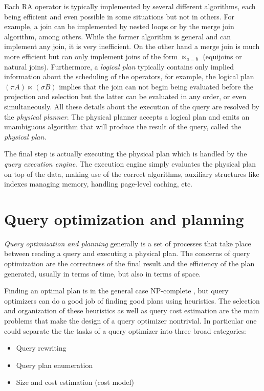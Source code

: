 Each RA operator is typically implemented by several different
algorithms, each being efficient and even possible in some situations
but not in others. For example, a join can be implemented by nested
loops or by the merge join algorithm, among others.  While the former algorithm is
general and can implement any join, it is very inefficient. On the
other hand a merge join is much more efficient but can only implement
joins of the form \(\Join_{a=b}\) (equijoins or natural
joins). Furthermore, a \emph{logical plan} typically contains only
implied information about the scheduling of the operators, for
example, the logical plan \((\pi A) \Join (\sigma B)\) implies that
the join can not begin being evaluated before the projection and
selection but the latter can be evaluated in any order, or even
simultaneously. All these details about the execution
of the query are resolved by the \emph{physical planner}. The physical
planner accepts a logical plan and emits an unambiguous algorithm that
will produce the result of the query, called the \emph{physical plan}.

The final step is actually executing the physical plan which is
handled by the \emph{query execution engine}. The execution engine
simply evaluates the physical plan on top of the data, making use of
the correct algorithms, auxiliary structures like indexes managing
memory, handling page-level caching, etc.

\section{Query optimization and planning}

\emph{Query optimization and planning} generally is a set of processes that
take place between reading a query and executing a physical plan. The
concerns of query optimization are the correctness of the final result and
the efficiency of the plan generated, usually in terms of time, but
also in terms of space.

Finding an optimal plan is in the general case NP-complete
\cite{ullmanInformationIntegrationUsing1997}, but query optimizers can
do a good job of finding good plans using heuristics. The selection
and organization of these heuristics as well as query cost estimation
are the main problems that make the design of a query optimizer nontrivial. In
particular one could separate the the tasks of a query optimizer
into three broad categories:

\begin{itemize}
\item Query rewriting
\item Query plan enumeration
\item Size and cost estimation (cost model)
\end{itemize}


